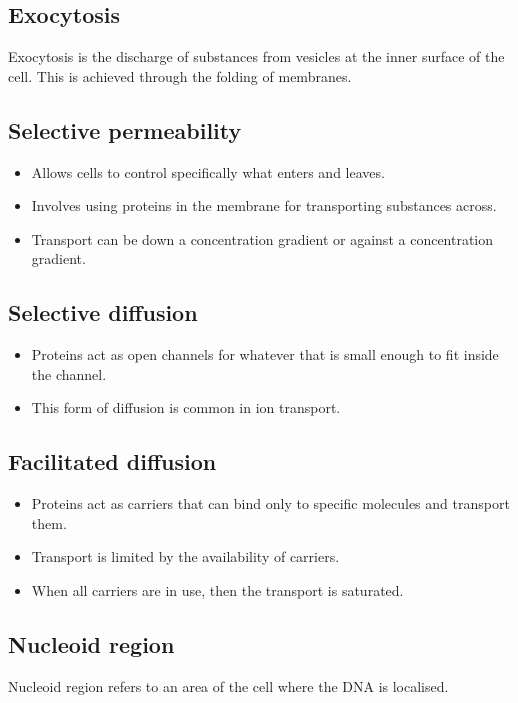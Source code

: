 \documentclass[11pt]{article}
\begin{document}
\subsection{Exocytosis}
\label{sec:orgb1a9441}
Exocytosis is the discharge of substances from vesicles at the inner surface of the cell. This is achieved through the folding of membranes.

\newpage

\subsection{Selective permeability}
\label{sec:org242ba8e}
\begin{itemize}
\item Allows cells to control specifically what enters and leaves.
\item Involves using proteins in the membrane for transporting substances across.
\item Transport can be down a concentration gradient or against a concentration gradient.
\end{itemize}

\subsection{Selective diffusion}
\label{sec:org046b474}
\begin{itemize}
\item Proteins act as open channels for whatever that is small enough to fit inside the channel.
\item This form of diffusion is common in ion transport.
\end{itemize}

\subsection{Facilitated diffusion}
\label{sec:orgf45f174}
\begin{itemize}
\item Proteins act as carriers that can bind only to specific molecules and transport them.
\item Transport is limited by the availability of carriers.
\item When all carriers are in use, then the transport is saturated.
\end{itemize}

\subsection{Nucleoid region}
\label{sec:org8138535}
Nucleoid region refers to an area of the cell where the DNA is localised.
\end{document}
